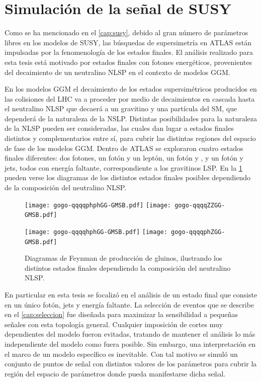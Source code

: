 \section{Simulación de la señal de SUSY}\label{sec:sig_samples}

Como se ha mencionado en el \cref{cap:susy}, debido al gran número de parámetros
libres en los modelos de SUSY, las búsquedas de supersimetría en ATLAS están
impulsadas por la fenomenología de los estados finales. El análisis realizado
para esta tesis está motivado por estados finales con fotones energéticos,
provenientes del decaimiento de un neutralino NLSP en el contexto de modelos
GGM.

En los modelos GGM el decaimiento de los estados supersimétricos producidos en
las colisiones del LHC va a proceder por medio de decaimientos en cascada hasta
el neutralino NLSP que decaerá a un gravitino y una partícula del SM, que
dependerá de la naturaleza de la NSLP. Distintas posibilidades para la
naturaleza de la NLSP pueden ser consideradas, las cuales dan lugar a estados
finales distintos y complementarios entre sí, para cubrir las distintas regiones
del espacio de fase de los modelos GGM. Dentro de ATLAS se exploraron cuatro
estados finales diferentes: dos fotones, un fotón y un leptón, un fotón y
{\bjets}, y un fotón y jets, todos con energía faltante, correspondiente a los
gravitinos LSP. En la \cref{fig:ggm_diagrams} pueden verse los diagramas de
los distintos estados finales posibles dependiendo de la composición del neutralino NLSP.


\begin{figure}[!htb]
  \centering

  \texttt{[image: gogo-qqqqphphGG-GMSB.pdf]}\hspace{1.5cm}
  \texttt{[image: gogo-qqqqZZGG-GMSB.pdf]}

  \texttt{[image: gogo-qqqqhphGG-GMSB.pdf]}\hspace{1.5cm}
  \texttt{[image: gogo-qqqqphZGG-GMSB.pdf]}

  \caption{Diagramas de Feynman de producción de gluinos, ilustrando los distintos
    estados finales dependiendo la composición del neutralino NLSP.}
  \label{fig:ggm_diagrams}
\end{figure}


En particular en esta tesis se focalizó en el análisis de un estado final que
consiste en un único fotón, jets y energía faltante.
La selección de eventos que se describe en el \cref{cap:seleccion} fue diseñada para
maximizar la sensibilidad a pequeñas señales con esta topología general.
Cualquier imposición de cortes muy dependientes del modelo fueron evitadas,
tratando de mantener el análisis lo más independiente del modelo como fuera
posible. Sin embargo, una interpretación en el marco de un modelo específico es
inevitable. Con tal motivo se simuló un conjunto de puntos de señal con
distintos valores de los parámetros para cubrir la región del espacio de
parámetros donde pueda manifestarse dicha señal.

